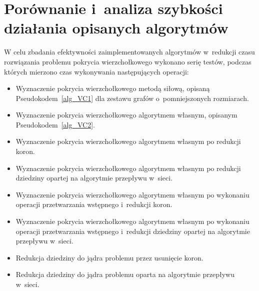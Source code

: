 \section{Porównanie i~analiza szybkości działania opisanych algorytmów}
\par{
  W celu zbadania efektywności zaimplementowanych algorytmów w~redukcji czasu rozwiązania problemu pokrycia wierzchołkowego wykonano serię testów, podczas których mierzono czas wykonywania następujących operacji:

  \begin{itemize}
    \item Wyznaczenie pokrycia wierzchołkowego metodą siłową, opisaną Pseudokodem~\ref{alg_VC1} dla zestawu grafów o~pomniejszonych rozmiarach.
    \item Wyznaczenie pokrycia wierzchołkowego algorytmem własnym, opisanym Pseudokodem~\ref{alg_VC2}.
    \item Wyznaczenie pokrycia wierzchołkowego algorytmem własnym po redukcji koron.
    \item Wyznaczenie pokrycia wierzchołkowego algorytmem własnym po redukcji dziedziny opartej na algorytmie przepływu w~sieci.
    \item Wyznaczenie pokrycia wierzchołkowego algorytmem własnym po wykonaniu operacji przetwarzania wstępnego i~redukcji koron.
    \item Wyznaczenie pokrycia wierzchołkowego algorytmem własnym po wykonaniu operacji przetwarzania wstępnego i~redukcji dziedziny opartej na algorytmie przepływu w~sieci.
    \item Redukcja dziedziny do jądra problemu przez usunięcie koron.
    \item Redukcja dziedziny do jądra problemu oparta na algorytmie przepływu w~sieci.
  \end{itemize}
}
